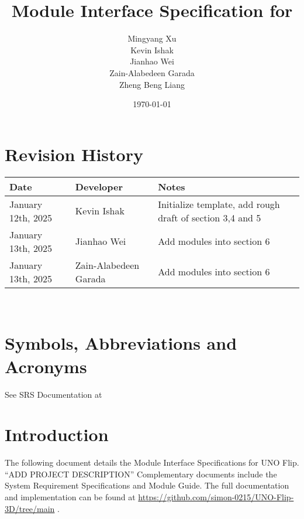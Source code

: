 \documentclass[12pt, titlepage]{article}
\begin{document}
\title{Module Interface Specification for }

\author{\authname Mingyang Xu \\ Kevin Ishak \\ Jianhao Wei \\ Zain-Alabedeen Garada \\ Zheng Beng Liang}

\date{\today}

\maketitle


\section{Revision History}

\begin{tabularx}{\textwidth}{p{4cm}p{3cm}X}
\toprule {\bf Date} & {\bf Developer} & {\bf Notes}\\
\midrule
January 12th, 2025 & Kevin Ishak & Initialize template, add rough draft of section 3,4 and 5\\
January 13th, 2025 & Jianhao Wei & Add modules into section 6\\
January 13th, 2025 & Zain-Alabedeen Garada & Add modules into section 6\\
\bottomrule
\end{tabularx}

~\newpage

\section{Symbols, Abbreviations and Acronyms}

See SRS Documentation at 


\newpage

\tableofcontents

\newpage


\section{Introduction}

The following document details the Module Interface Specifications for UNO Flip. “ADD PROJECT DESCRIPTION”
Complementary documents include the System Requirement Specifications and Module Guide. The full documentation and implementation can be found at \url{https://github.com/simon-0215/UNO-Flip-3D/tree/main} .
\end{document}
